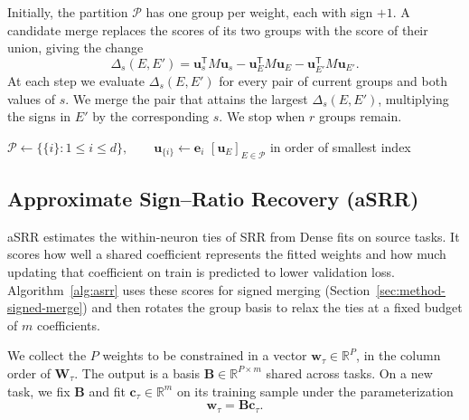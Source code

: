 Initially, the partition $\mathcal P$ has one group per weight, each
with sign $+1$. A candidate merge replaces the scores of its two
groups with the score of their union, giving the change
\begin{equation}
    \Delta_s(E,E')=\mathbf u_s^{\mathsf T}M\mathbf u_s
        -\mathbf u_E^{\mathsf T}M\mathbf u_E
        -\mathbf u_{E'}^{\mathsf T}M\mathbf u_{E'}.
    \label{eq:asrr-merge}
\end{equation}
At each step we evaluate $\Delta_s(E,E')$ for every pair of current
groups and both values of $s$. We merge the pair that attains the
largest $\Delta_s(E,E')$, multiplying the signs in $E'$ by the
corresponding $s$. We stop when $r$ groups remain.

\begin{algorithm}[H]
    \small
    \DontPrintSemicolon
    \SetAlgoNoEnd
    \caption{Greedy signed merging}
    \label{alg:signed-merge}
    $\mathcal P\gets\{\{i\}:1\le i\le d\},\qquad
        \mathbf u_{\{i\}}\gets\mathbf e_i$\;
    \Return $[\mathbf u_E]_{E\in\mathcal P}$ in order of smallest index\;
\end{algorithm}

\subsection{Approximate Sign--Ratio Recovery (aSRR)}
\label{sec:method-asrr}

aSRR estimates the within-neuron ties of SRR from Dense fits on source
tasks. It scores how well a shared coefficient represents the fitted
weights and how much updating that coefficient on train is predicted
to lower validation loss. Algorithm~\ref{alg:asrr} uses these scores for
signed merging (Section~\ref{sec:method-signed-merge}) and then rotates
the group basis to relax the ties at a fixed budget of $m$ coefficients.

We collect the $P$ weights to be constrained in a vector
$\mathbf w_\tau\in\mathbb R^P$, in the column order of $\mathbf W_\tau$.
The output is a basis $\mathbf B\in\mathbb R^{P\times m}$ shared across
tasks. On a new task, we fix $\mathbf B$ and fit
$\mathbf c_\tau\in\mathbb R^m$ on its training sample under the
parameterization
\[
    \mathbf w_\tau=\mathbf B\mathbf c_\tau.
\]

